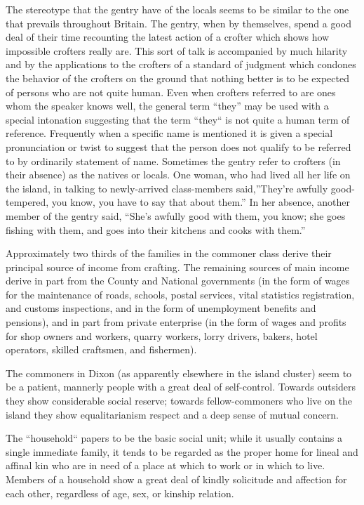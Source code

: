 \documentclass[twoside,symmetric,nobib,justified]{tufte-book}
\begin{document}
The stereotype that the gentry have of the locals seems to be similar to
the one that prevails throughout Britain. The gentry, when by
themselves, spend a good deal of their time recounting the latest action
of a crofter which shows how impossible crofters really are. This sort
of talk is accompanied by much hilarity and by the applications to the
crofters of a standard of judgment which condones the behavior of the
crofters on the ground that nothing better is to be expected of persons
who are not quite human. Even when crofters referred to are ones whom
the speaker knows well, the general term ``they'' may be used with a
special intonation suggesting that the term ``they`` is not quite a
human term of reference. Frequently when a specific name is mentioned it
is given a special pronunciation or twist to suggest that the person
does not qualify to be referred to by ordinarily statement of name.
Sometimes the gentry refer to crofters (in their absence) as the natives
or locals. One woman, who had lived all her life on the island, in
talking to newly-arrived class-members said,''They're awfully
good-tempered, you know, you have to say that about them.'' In her
absence, another member of the gentry said, ``She's awfully good with
them, you know; she goes fishing with them, and goes into their kitchens
and cooks with them.''

Approximately two thirds of the families in the commoner class derive
their principal source of income from crafting. The remaining sources of
main income derive in part from the County and National governments (in
the form of wages for the maintenance of roads, schools, postal
services, vital statistics registration, and customs inspections, and in
the form of unemployment benefits and pensions), and in part from
private enterprise (in the form of wages and profits for shop owners and
workers, quarry workers, lorry drivers, bakers, hotel operators, skilled
craftsmen, and fishermen).

The commoners in Dixon (as apparently elsewhere in the island cluster)
seem to be a patient, mannerly people with a great deal of self-control.
Towards outsiders they show considerable social reserve; towards
fellow-commoners who live on the island they show equalitarianism
respect and a deep sense of mutual concern.

The ``household`` papers to be the basic social unit; while it usually
contains a single immediate family, it tends to be regarded as the
proper home for lineal and affinal kin who are in need of a place at
which to work or in which to live. Members of a household show a great
deal of kindly solicitude and affection for each other, regardless of
age, sex, or kinship relation.
\end{document}
